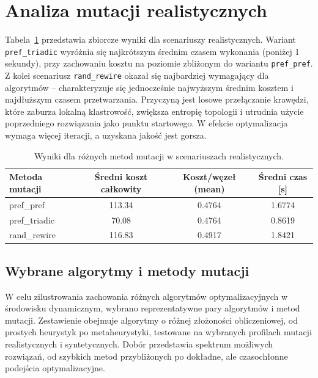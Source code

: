 \section{Analiza mutacji realistycznych}
Tabela~\ref{tab:dyn-real-warm} przedstawia zbiorcze wyniki dla scenariuszy realistycznych. Wariant \texttt{pref\_triadic} wyróżnia się najkrótszym średnim czasem wykonania (poniżej 1 sekundy), przy zachowaniu kosztu na poziomie zbliżonym do wariantu \texttt{pref\_pref}. Z kolei scenariusz \texttt{rand\_rewire} okazał się najbardziej wymagający dla algorytmów -- charakteryzuje się jednocześnie najwyższym średnim kosztem i najdłuższym czasem przetwarzania. Przyczyną jest losowe przełączanie krawędzi, które zaburza lokalną klastrowość, zwiększa entropię topologii i utrudnia użycie poprzedniego rozwiązania jako punktu startowego. W efekcie optymalizacja wymaga więcej iteracji, a uzyskana jakość jest gorsza.


\begin{table}[H]
  \centering
  \caption{Wyniki dla różnych metod mutacji w scenariuszach realistycznych.}
  \label{tab:dyn-real-warm}
  \begin{tabular}{lccc}
    \toprule
    \textbf{Metoda mutacji} & \textbf{Średni koszt całkowity} & \textbf{Koszt/węzeł (mean)} & \textbf{Średni czas [s]} \\
    \midrule
    pref\_pref              & 113.34                          & 0.4764                      & 1.6774                   \\
    pref\_triadic           & 70.08                           & 0.4764                      & 0.8619                   \\
    rand\_rewire            & 116.83                          & 0.4917                      & 1.8421                   \\
    \bottomrule
  \end{tabular}
\end{table}

\subsection{Wybrane algorytmy i metody mutacji}
W celu zilustrowania zachowania różnych algorytmów optymalizacyjnych w środowisku dynamicznym, wybrano reprezentatywne pary algorytmów i metod mutacji. Zestawienie obejmuje algorytmy o różnej złożoności obliczeniowej, od prostych heurystyk po metaheurystyki, testowane na wybranych profilach mutacji realistycznych i syntetycznych. Dobór przedstawia spektrum możliwych rozwiązań, od szybkich metod przybliżonych po dokładne, ale czasochłonne podejścia optymalizacyjne.

